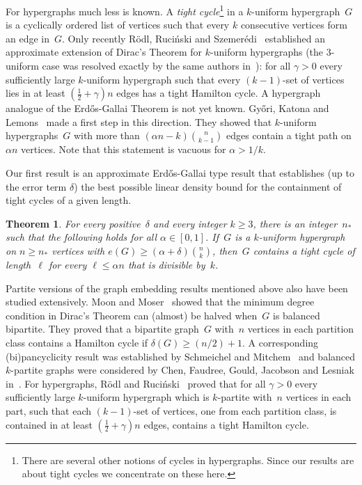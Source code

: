 \documentclass[12pt,a4paper]{amsart}
\newtheorem{theorem}{Theorem}%
\begin{document}
For hypergraphs much less is known. A \emph{tight cycle}\footnote{There
  are several other notions of cycles in hypergraphs. Since our results are
  about tight cycles we concentrate on these here.} in a $k$-uniform
hypergraph~$G$ is a cyclically ordered list of vertices such that every $k$
consecutive vertices form an edge in~$G$.  Only recently R\"odl, Ruci\'nski
and Szemer\'edi~\cite{RRSHam} established an approximate extension of
Dirac's Theorem for $k$-uniform hypergraphs (the $3$-uniform case was
resolved exactly by the same authors in~\cite{RRS3unif}): for all $\gamma>0$ every
sufficiently large $k$-uniform hypergraph such that every $(k-1)$-set of
vertices lies in at least $(\frac12+\gamma)n$ edges has a tight Hamilton
cycle. A hypergraph analogue of the Erd\H{o}s-Gallai Theorem is not yet
known.  Gy\H{o}ri, Katona and Lemons~\cite{GyKatLem} made a first step in
this direction. They showed that $k$-uniform hypergraphs~$G$ with more than
$(\alpha n-k)\binom{n}{k-1}$ edges contain a tight path on $\alpha n$
vertices. Note that this statement is vacuous for $\alpha>1/k$.

Our first result is an approximate Erd\H{os}-Gallai type result that
establishes (up to the error term $\delta$) the best possible linear
density bound for the containment of tight cycles of a given length.

\begin{theorem}\label{thm:HypErdGal}
  For every positive~$\delta$ and every integer $k \ge 3$, there is an
  integer~$n_*$ such that the following holds for all $\alpha\in[0,1]$.
  If~$G$ is a $k$-uniform hypergraph on $n\ge n_*$ vertices with
  $e(G)\ge(\alpha+\delta)\binom{n}{k}$, then~$G$ contains a tight cycle of length~$\ell$ for every
      $\ell\le\alpha n$ that is divisible by~$k$.
\end{theorem}

Partite versions of the graph embedding results mentioned above also have
been studied extensively. Moon and Moser~\cite{MooMos} showed that the
minimum degree condition in Dirac's Theorem can (almost) be halved when~$G$
is balanced bipartite. They proved that a bipartite graph~$G$ with~$n$
vertices in each partition class contains a Hamilton cycle if
$\delta(G)\ge(n/2)+1$. A corresponding (bi)pancyclicity result was
established by Schmeichel and Mitchem~\cite{SchMit} and balanced
$k$-partite graphs were considered by Chen, Faudree, Gould, Jacobson and Lesniak in~\cite{CheFauGouJacLes}.
For hypergraphs, R\"odl and Ruci\'nski~\cite{RSHamSurvey} proved that
for all $\gamma>0$ every sufficiently large $k$-uniform hypergraph which is
$k$-partite with~$n$ vertices in each part, such that each $(k-1)$-set of
vertices, one from each partition class, is contained in at least
$(\frac12+\gamma)n$ edges, contains a tight Hamilton cycle.
\end{document}
